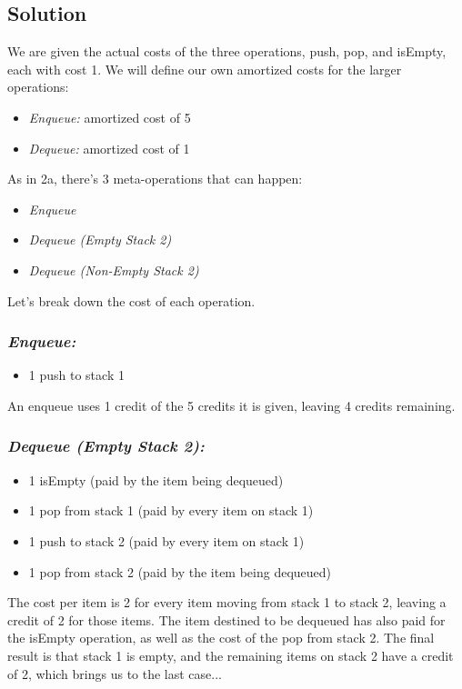 \subsection*{Solution}

We are given the actual costs of the three operations, push, pop, and isEmpty, each with cost 1. We will define our own amortized costs for the larger operations: 
\begin{itemize}
\item {\em Enqueue:} amortized cost of 5
\item {\em Dequeue:} amortized cost of 1
\end{itemize}

As in 2a, there's 3 meta-operations that can happen:
\begin{itemize}
\item {\em Enqueue} 
\item {\em Dequeue (Empty Stack 2)} 
\item {\em Dequeue (Non-Empty Stack 2)} 
\end{itemize}

Let's break down the cost of each operation.

\subsubsection*{\em Enqueue:} 
\begin{itemize}
\item 1 push to stack 1
\end{itemize}

An enqueue uses 1 credit of the 5 credits it is given, leaving 4 credits remaining.

\subsubsection*{\em Dequeue (Empty Stack 2):}
\begin{itemize}
\item 1 isEmpty (paid by the item being dequeued)
\item 1 pop from stack 1 (paid by every item on stack 1)
\item 1 push to stack 2 (paid by every item on stack 1)
\item 1 pop from stack 2 (paid by the item being dequeued)
\end{itemize}

The cost per item is 2 for every item moving from stack 1 to stack 2, leaving a credit of 2 for those items. The item destined to be dequeued has also paid for the isEmpty operation, as well as the cost of the pop from stack 2. The final result is that stack 1 is empty, and the remaining items on stack 2 have a credit of 2, which brings us to the last case...


